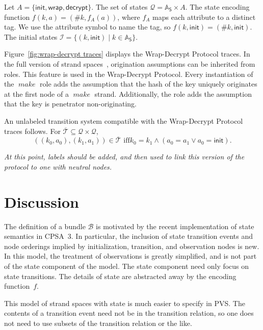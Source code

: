\documentclass[12pt]{article}
\newcommand{\fn}[1]{\ensuremath{\operatorname{\mathit{#1}}}}
\newcommand{\srt}[1]{\ensuremath{\mathsf{#1}}}
\newcommand{\alg}{\ensuremath{\mathbb{A}}}
\newcommand{\bun}{\ensuremath{\mathcal{B}}}
\newcommand{\sta}{\ensuremath{\mathcal{Q}}}
\newcommand{\init}{\ensuremath{\mathcal{I}}}
\newcommand{\tran}{\ensuremath{\mathcal{T}}}
\newcommand{\cbar}[1]{\ensuremath{\overline{#1}}}
\newcommand{\ainit}{\ensuremath{\mathsf{init}}}
\newcommand{\awrap}{\ensuremath{\mathsf{wrap}}}
\newcommand{\adecrypt}{\ensuremath{\mathsf{decrypt}}}
\begin{document}
Let $A=\{\ainit,\awrap,\adecrypt\}$.  The set of states
$\sta=\alg_\srt{S}\times A$.  The state encoding function
$f(k,a)=(\#k,f_A(a))$, where $f_A$ maps each attribute to a distinct
tag.  We use the attribute symbol to name the tag, so
$f(k,\ainit)=(\#k,\ainit)$.  The initial states
$\init=\{(k,\ainit)\mid k\in\alg_\srt{S}\}$.

Figure~\ref{fig:wrap-decrypt traces} displays the Wrap-Decrypt
Protocol traces.  In the full version of strand
spaces~\cite{Ramsdell13}, origination assumptions can be inherited
from roles.  This feature is used in the Wrap-Decrypt Protocol.  Every
instantiation of the \fn{make} role adds the assumption that the hash
of the key uniquely originates at the first node of a \fn{make}
strand.  Additionally, the role adds the assumption that the key is
penetrator non-originating.

An unlabeled transition system compatible with the
Wrap-Decrypt Protocol traces follows.  For
$\cbar{\tran}\subseteq\sta\times\sta$,
\[((k_0,a_0),(k_1,a_1))\in\cbar{\tran}\mbox{ iff
}k_0=k_1\land(a_0=a_1\lor a_0=\ainit).\]

\emph{At this point, labels should be added, and then used to link
  this version of the protocol to one with neutral nodes.}

\section{Discussion}

The definition of a bundle {\bun} is motivated by the recent
implementation of state semantics in CPSA~3.  In particular, the
inclusion of state transition events and node orderings implied by
initialization, transition, and observation nodes is new.  In this
model, the treatment of observations is greatly simplified, and is not
part of the state component of the model.  The state component need
only focus on state transitions.  The details of state are abstracted
away by the encoding function~$f$.

This model of strand spaces with state is much easier to specify in
PVS\@. The contents of a transition event need not be in the
transition relation, so one does not need to use subsets of the
transition relation or the like.



\end{document}
